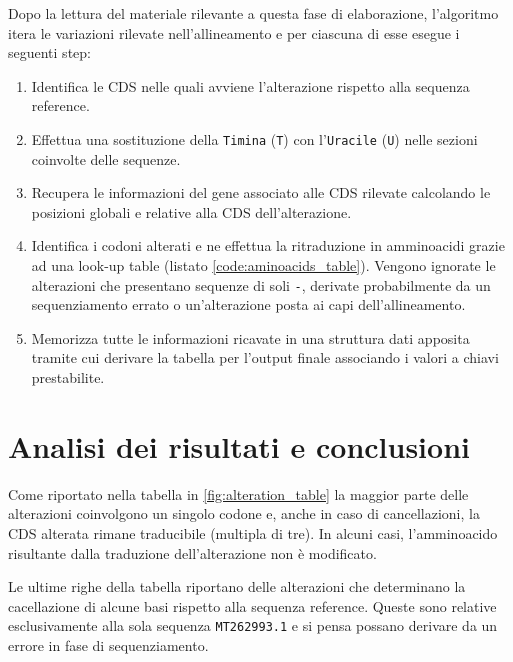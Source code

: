 \documentclass[11pt,italian]{article}
\begin{document}
\noindent
Dopo la lettura del materiale rilevante a questa fase di elaborazione, l'algoritmo itera le variazioni rilevate nell'allineamento e per ciascuna di esse esegue i seguenti step:
\begin{enumerate}
  \item Identifica le CDS nelle quali avviene l'alterazione rispetto alla sequenza reference.
  \item Effettua una sostituzione della \lstinline{Timina} (\lstinline{T}) con l'\lstinline{Uracile} (\lstinline{U}) nelle sezioni coinvolte delle sequenze.
  \item Recupera le informazioni del gene associato alle CDS rilevate calcolando le posizioni globali e relative alla CDS dell'alterazione.
  \item Identifica i codoni alterati e ne effettua la ritraduzione in amminoacidi grazie ad una look-up table (listato \ref{code:aminoacids_table}). Vengono ignorate le alterazioni che presentano sequenze di soli \lstinline{-}, derivate probabilmente da un sequenziamento errato o un'alterazione posta ai capi dell'allineamento.
  \item Memorizza tutte le informazioni ricavate in una struttura dati apposita tramite cui derivare la tabella per l'output finale associando i valori a chiavi prestabilite.
\end{enumerate}

\newpage
\section{Analisi dei risultati e conclusioni}
Come riportato nella tabella in \cref{fig:alteration_table} la maggior parte delle alterazioni coinvolgono un singolo codone e, anche in caso di cancellazioni, la CDS alterata rimane traducibile (multipla di tre). In alcuni casi, l'amminoacido risultante dalla traduzione dell'alterazione non è modificato.

Le ultime righe della tabella riportano delle alterazioni che determinano la cacellazione di alcune basi rispetto alla sequenza reference.
Queste sono relative esclusivamente alla sola sequenza \lstinline{MT262993.1} e si pensa possano derivare da un errore in fase di sequenziamento.
\end{document}
